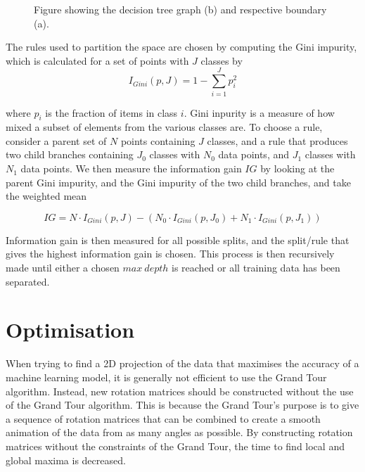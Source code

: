 \documentclass[a4paper,11pt,twoside]{article}
\begin{document}
\begin{figure}[h]
    \centering
    \qquad
    \caption{Figure showing the decision tree graph (b) and respective boundary (a).}%
    \label{fig:example}%
\end{figure}

The rules used to partition the space are chosen by computing the Gini impurity, which is calculated for a set of points with $J$ classes by
\begin{equation}
I_{Gini}(p, J)=1-\sum_{i=1}^Jp_i^2
\end{equation}

where $p_i$ is the fraction of items in class $i$. Gini inpurity is a measure of how mixed a subset of elements from the various classes are. To choose a rule, consider a parent set of $N$ points containing $J$ classes, and a rule that produces two child branches containing $J_0$ classes with $N_0$ data points, and $J_1$ classes with $N_1$ data points. We then measure the information gain $IG$ by looking at the parent Gini impurity, and the Gini impurity of the two child branches, and take the weighted mean

\begin{equation}
IG= N\cdot I_{Gini}(p, J) - (N_0\cdot I_{Gini}(p, J_0) + N_1\cdot I_{Gini}(p, J_1))
\end{equation}

Information gain is then measured for all possible splits, and the split/rule that gives the highest information gain is chosen. This process is then recursively made until either a chosen $max\ depth$ is reached or all training data has been separated.  

\newpage
\section{Optimisation}

When trying to find a 2D projection of the data that maximises the accuracy of a machine learning model, it is generally not efficient to use the Grand Tour algorithm. Instead, new rotation matrices should be constructed without the use of the Grand Tour algorithm. This is because the Grand Tour's purpose is to give a sequence of rotation matrices that can be combined to create a smooth animation of the data from as many angles as possible. By constructing rotation matrices without the constraints of the Grand Tour, the time to find local and global maxima is decreased.
\end{document}
